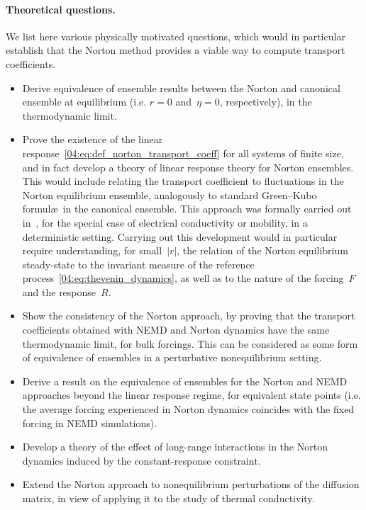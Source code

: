 \paragraph{Theoretical questions.}
We list here various physically motivated questions, which would in particular establish that the Norton method provides a viable way to compute transport coefficients.
\begin{itemize}
    \item Derive equivalence of ensemble results between the Norton and canonical ensemble at equilibrium (i.e. $r=0$ and~$\eta = 0$, respectively), in the thermodynamic limit.
    \item Prove the existence of the linear response~\eqref{04:eq:def_norton_transport_coeff} for all systems of finite size, and in fact develop a theory of linear response theory for Norton ensembles. This would include relating the transport coefficient to fluctuations in the Norton equilibrium ensemble, analogously to standard Green--Kubo formul\ae\ in the canonical ensemble. This approach was formally carried out in~\cite{EM85}, for the special case of electrical conductivity or mobility, in a deterministic setting. Carrying out this development would in particular require understanding, for small~$|r|$, the relation of the Norton equilibrium steady-state to the invariant measure of the reference process~\eqref{04:eq:thevenin_dynamics}, as well as to the nature of the forcing~$F$ and the response~$R$.
    \item Show the consistency of the Norton approach, by proving that the transport coefficients obtained with NEMD and Norton dynamics have the same thermodynamic limit, for bulk forcings. This can be considered as some form of equivalence of ensembles in a perturbative nonequilibrium setting.
    \item Derive a result on the equivalence of ensembles for the Norton and NEMD approaches beyond the linear response regime, for equivalent state points (i.e. the average forcing experienced in Norton dynamics coincides with the fixed forcing in NEMD simulations).
    \item Develop a theory of the effect of long-range interactions in the Norton dynamics induced by the constant-response constraint.
    \item Extend the Norton approach to nonequilibrium perturbations of the diffusion matrix, in view of applying it to the study of thermal conductivity.
\end{itemize}

